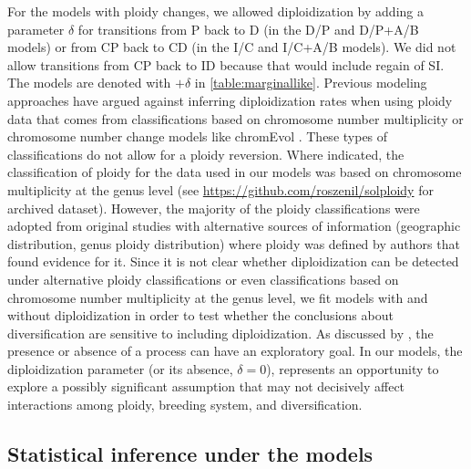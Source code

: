 For the models with ploidy changes, we allowed diploidization by adding a parameter $\delta$ for transitions from P back to D (in the D/P and D/P+A/B models) or from CP back to CD (in the I/C and I/C+A/B models).
We did not allow transitions from CP back to ID because that would include regain of SI.
The models are denoted with $+\delta$ in \cref{table:marginallike}.
Previous modeling approaches \citep{mayrose_2011} have argued against inferring diploidization rates when using ploidy data that comes from classifications based on chromosome number multiplicity or chromosome number change models like chromEvol \citep{mayrose_2010, glick2014, mayrose_2015, freyman_2017}.
These types of classifications do not allow for a ploidy reversion.
Where indicated, the classification of ploidy for the data used in our models was based on chromosome multiplicity at the genus level (see \url{https://github.com/roszenil/solploidy} for archived dataset). %
However, the majority of the ploidy classifications were adopted from original studies with alternative sources of information (\eg geographic distribution, genus ploidy distribution) where ploidy was defined by authors that found evidence for it.
Since it is not clear whether diploidization can be detected under alternative ploidy classifications or even classifications based on chromosome number multiplicity at the genus level, we fit models with and without diploidization in order to test  whether the conclusions about diversification are sensitive to including diploidization.
As discussed by \citet{servedio_2014}, the presence or absence of a process can have an exploratory goal.
In our models, the diploidization parameter (or its absence, $\delta=0$), represents an opportunity to explore a possibly significant assumption that may not decisively affect interactions among ploidy, breeding system, and diversification.

\subsection{Statistical inference under the models}

